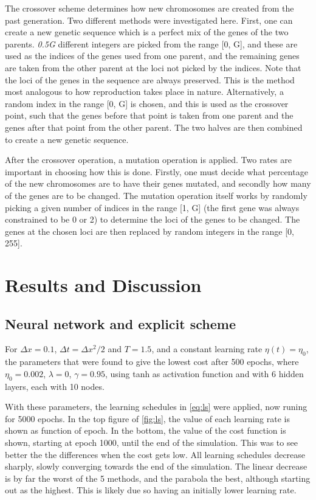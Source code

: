 \documentclass[multicolumn, 10pt]{extarticle}
\begin{document}
The crossover scheme determines how new chromosomes are created from the past generation. Two different methods were investigated here. First, one can create a new genetic sequence which is a perfect mix of the genes of the two parents. \textit{0.5G} different integers are picked from the range [0, G], and these are used as the indices of the genes used from one parent, and the remaining genes are taken from the other parent at the loci not picked by the indices. Note that the loci of the genes in the sequence are always preserved. This is the method most analogous to how reproduction takes place in nature. Alternatively, a random index in the range [0, G] is chosen, and this is used as the crossover point, such that the genes before that point is taken from one parent and the genes after that point from the other parent. The two halves are then combined to create a new genetic sequence.

After the crossover operation, a mutation operation is applied. Two rates are important in choosing how this is done. Firstly, one must decide what percentage of the new chromosomes are to have their genes mutated, and secondly how many of the genes are to be changed. The mutation operation itself works by randomly picking a given number of indices in the range [1, G] (the first gene was always constrained to be 0 or 2) to determine the loci of the genes to be changed. The genes at the chosen loci are then replaced by random integers in the range [0, 255].

\section{Results and Discussion}

\subsection{Neural network and explicit scheme}
For $\Delta x=0.1$, $\Delta t=\Delta x^2/2$ and $T=1.5$, and a constant learning rate $\eta(t)=\eta_0$, the parameters that were found to give the lowest cost after 500 epochs, where $\eta_0=0.002$, $\lambda=0$, $\gamma=0.95$, using tanh as activation function and with 6 hidden layers, each with 10 nodes.

With these parameters, the learning schedules in \eqref{eq:ls} were applied, now runing for 5000 epochs. In the top figure of \ref{fig:ls}, the value of each learning rate is shown as function of epoch. In the bottom, the value of the cost function is shown, starting at epoch 1000, until the end of the simulation. This was to see better the the differences when the cost gets low. All learning schedules decrease sharply, slowly converging towards the end of the simulation. The linear decrease is by far the worst of the 5 methods, and the parabola the best, although starting out as the highest. This is likely due so having an initially lower learning rate.
\end{document}
